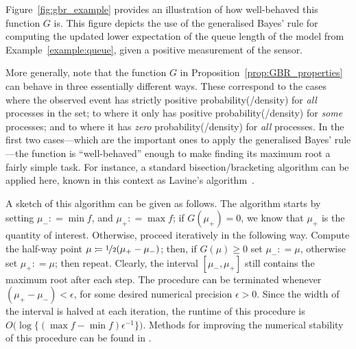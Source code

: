 \documentclass[3p]{elsarticle}
\newcommand{\lexp}{\underline{\mathbb{E}}_{\rateset,\mathcal{M}}}
\newcommand{\uexp}{\overline{\mathbb{E}}_{\rateset,\mathcal{M}}}
\newcommand{\rateset}{\mathcal{Q}}
\newcommand{\coloneqq}{:\!=}
\begin{document}
Figure~\ref{fig:gbr_example} provides an illustration of how well-behaved this function $G$ is. This figure depicts the use of the generalised Bayes' rule for computing the updated lower expectation of the queue length of the model from Example~\ref{example:queue}, given a positive measurement of the sensor.

More generally, note that the function $G$ in Proposition~\ref{prop:GBR_properties} can behave in three essentially different ways. These correspond to the cases where the observed event has strictly positive probability(/density) for \emph{all} processes in the set; to where it only has positive probability(/density) for \emph{some} processes; and to where it has \emph{zero} probability(/density) for \emph{all} processes.
In the first two cases---which are the important ones to apply the generalised Bayes' rule---the function is ``well-behaved'' enough to make finding its maximum root a fairly simple task. For instance, a standard bisection/bracketing algorithm can be applied here, known in this context as Lavine's algorithm~\citep{cozman1997alternatives}. 

A sketch of this algorithm can be given as follows.
The algorithm %
starts by setting $\mu_-\coloneqq \min f$, and $\mu_+\coloneqq \max f$; if $G(\mu_+)=0$, we know that $\mu_+$ is the quantity of interest. Otherwise, proceed iteratively in the following way. Compute the half-way point $\mu\coloneqq \nicefrac{1}{2}(\mu_+-\mu_-)$; then, if $G(\mu)\geq 0$ set $\mu_-\coloneqq \mu$, otherwise set $\mu_+\coloneqq\mu$; then repeat. Clearly, the interval $[\mu_-,\mu_+]$ still contains the maximum root after each step. The procedure can be terminated whenever $(\mu_+-\mu_-)<\epsilon$, for some desired numerical precision $\epsilon>0$. Since the width of the interval is halved at each iteration, the runtime of this procedure is $O\bigl(\log\{(\max f - \min f)\epsilon^{-1}\}\bigr)$.
Methods for improving the numerical stability of this procedure can be found in \cite[Section 2.7.3]{de2015credal}. 
\end{document}
